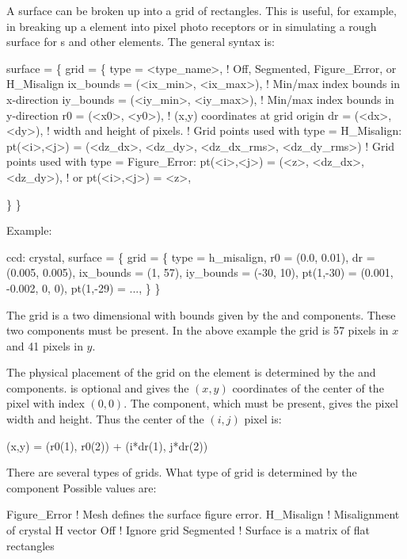 A surface can be broken up into a grid of rectangles. This is useful, for example, in breaking up a
 element into pixel photo receptors or in simulating a rough surface for s
and other elements. The general syntax is:
\begin{example}
  surface = \{
    grid = \{                
      type = <type_name>,                ! Off, Segmented, Figure_Error, or H_Misalign
      ix_bounds = (<ix_min>, <ix_max>),  ! Min/max index bounds in x-direction
      iy_bounds = (<iy_min>, <iy_max>),  ! Min/max index bounds in y-direction
      r0 = (<x0>, <y0>),                 ! (x,y) coordinates at grid origin
      dr = (<dx>, <dy>),                 ! width and height of pixels.
      ! Grid points used with type = H_Misalign:
      pt(<i>,<j>) = (<dz_dx>, <dz_dy>, <dz_dx_rms>, <dz_dy_rms>)
      ! Grid points used with type = Figure_Error:
      pt(<i>,<j>) = (<z>, <dz_dx>, <dz_dy>),    ! or
      pt(<i>,<j>) = <z>, 
                                         
          \} \}
\end{example}
Example:
\begin{example}
  ccd: crystal, surface = \{
          grid = \{
            type = h_misalign,
            r0 = (0.0, 0.01), dr = (0.005, 0.005),
            ix_bounds = (1, 57), iy_bounds = (-30, 10),
            pt(1,-30) = (0.001, -0.002, 0, 0), 
            pt(1,-29) = ..., 
          \} \}
\end{example}

The grid is a two dimensional with bounds given by the  and 
components. These two components must be present. In the above example the grid is 57 pixels in $x$
and 41 pixels in $y$.

The physical placement of the grid on the element is determined by the  and 
components.  is optional and gives the $(x,y)$ coordinates of the center of the pixel with
index $(0,0)$. The  component, which must be present, gives the pixel width and height. Thus
the center of the $(i,j)$ pixel is:
\begin{example}
  (x,y) = (r0(1), r0(2)) + (i*dr(1), j*dr(2))
\end{example}

There are several types of grids. What type of grid is determined by the  component
Possible  values are:
\begin{example}
  Figure_Error       ! Mesh defines the surface figure error.
  H_Misalign         ! Misalignment of crystal H vector
  Off                ! Ignore grid
  Segmented          ! Surface is a matrix of flat rectangles
\end{example}

